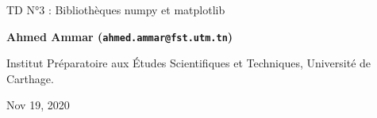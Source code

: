\documentclass[%
oneside,                 %
final,                   %
10pt,french]{article}
\begin{document}

\newcommand{\exercisesection}[1]{\subsection*{#1}}






\thispagestyle{empty}

\begin{center}
{\LARGE\bf
\begin{spacing}{1.25}
TD N°3 : Bibliothèques numpy et matplotlib
\end{spacing}
}
\end{center}


\begin{center}
{\bf Ahmed Ammar (\texttt{ahmed.ammar@fst.utm.tn})}
\end{center}

    \begin{center}
\centerline{{\small Institut Préparatoire aux Études Scientifiques et Techniques, Université de Carthage.}}
\end{center}
    

\begin{center}
Nov 19, 2020
\end{center}

\vspace{1cm}


\tableofcontents


\vspace{1cm} %




\end{document}

